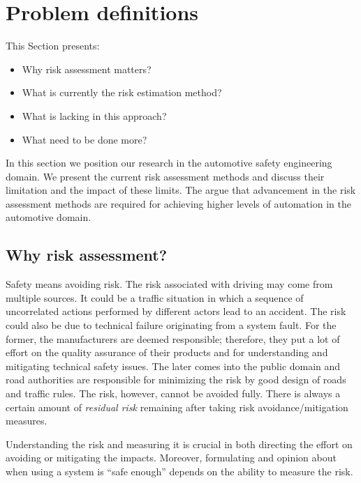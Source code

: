 \section{Problem definitions}
\label{sec:problem} %

This Section presents: 
\begin{itemize}
	\item Why risk assessment matters?
	\item What is currently the risk estimation method? 
	\item What is lacking in this approach? 
	\item What need to be done more? 
\end{itemize}

In this section we position our research in the automotive safety engineering domain. 
We present the current risk assessment methods and discuss their limitation and the impact of these limits.
The argue that advancement in the risk assessment methods are required for achieving higher levels of automation in the automotive domain. 

\subsection{Why risk assessment?}

Safety means avoiding risk. 
The risk associated with driving may come from multiple sources. 
It could be a traffic situation in which a sequence of uncorrelated actions performed by different actors lead to an accident. 
The risk could also be due to technical failure originating from a system fault. 
For the former, the manufacturers are deemed responsible; 
	therefore, they put a lot of effort on the quality  assurance of their products 
		and for understanding and mitigating technical safety issues.  
The later comes into the public domain and road authorities are responsible for minimizing the risk by good design of roads and traffic rules. 
The  risk, however, cannot be avoided fully. 
There is always a certain amount of \textit{residual risk} remaining after taking risk avoidance/mitigation measures. 

Understanding the risk and measuring it is crucial in both directing the effort on avoiding or mitigating the impacts. 
Moreover, formulating and opinion about when using a system is ``safe enough'' depends on the ability to measure the risk. 
	


